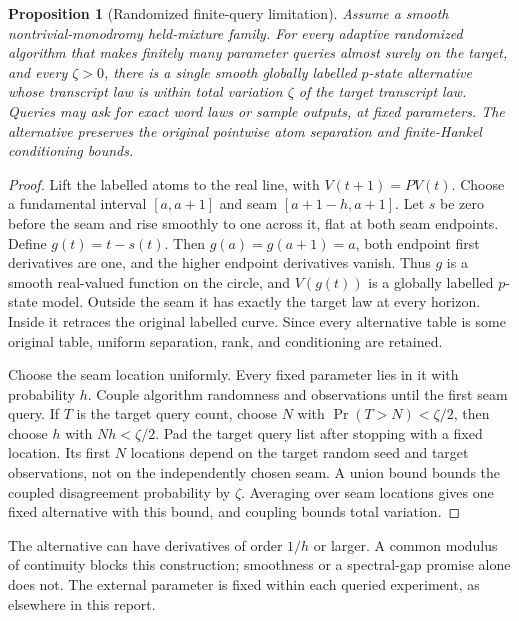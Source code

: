 \documentclass[11pt]{article}
\newtheorem{proposition}[theorem]{Proposition}
\theoremstyle{definition}\newtheorem{definition}[theorem]{Definition}
\theoremstyle{remark}\newtheorem{remark}[theorem]{Remark}
\begin{document}
\begin{proposition}[Randomized finite-query limitation]\label{prop:seam}
Assume a smooth nontrivial-monodromy held-mixture family. For every adaptive randomized algorithm that makes finitely many parameter queries almost surely on the target, and every $\zeta>0$, there is a single smooth globally labelled $p$-state alternative whose transcript law is within total variation $\zeta$ of the target transcript law. Queries may ask for exact word laws or sample outputs, at fixed parameters. The alternative preserves the original pointwise atom separation and finite-Hankel conditioning bounds.
\end{proposition}
\begin{proof}
Lift the labelled atoms to the real line, with $V(t+1)=PV(t)$. Choose a fundamental interval $[a,a+1]$ and seam $[a+1-h,a+1]$. Let $s$ be zero before the seam and rise smoothly to one across it, flat at both seam endpoints. Define $g(t)=t-s(t)$. Then $g(a)=g(a+1)=a$, both endpoint first derivatives are one, and the higher endpoint derivatives vanish. Thus $g$ is a smooth real-valued function on the circle, and $V(g(t))$ is a globally labelled $p$-state model. Outside the seam it has exactly the target law at every horizon. Inside it retraces the original labelled curve. Since every alternative table is some original table, uniform separation, rank, and conditioning are retained.

Choose the seam location uniformly. Every fixed parameter lies in it with probability $h$. Couple algorithm randomness and observations until the first seam query. If $T$ is the target query count, choose $N$ with $\Pr(T>N)<\zeta/2$, then choose $h$ with $Nh<\zeta/2$. Pad the target query list after stopping with a fixed location. Its first $N$ locations depend on the target random seed and target observations, not on the independently chosen seam. A union bound bounds the coupled disagreement probability by $\zeta$. Averaging over seam locations gives one fixed alternative with this bound, and coupling bounds total variation.
\end{proof}
The alternative can have derivatives of order $1/h$ or larger. A common modulus of continuity blocks this construction; smoothness or a spectral-gap promise alone does not. The external parameter is fixed within each queried experiment, as elsewhere in this report.
\end{document}
